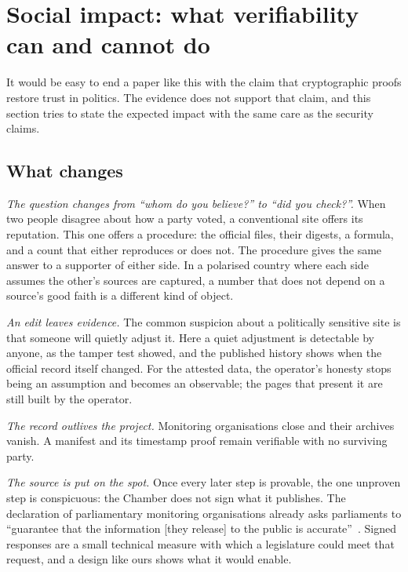 \section{Social impact: what verifiability can and cannot do}
\label{sec:discussion}

It would be easy to end a paper like this with the claim that cryptographic proofs restore trust in politics. The evidence does not support that claim, and this section tries to state the expected impact with the same care as the security claims.

\subsection{What changes}

\emph{The question changes from ``whom do you believe?'' to ``did you check?''.} When two people disagree about how a party voted, a conventional site offers its reputation. This one offers a procedure: the official files, their digests, a formula, and a count that either reproduces or does not. The procedure gives the same answer to a supporter of either side. In a polarised country where each side assumes the other's sources are captured, a number that does not depend on a source's good faith is a different kind of object.

\emph{An edit leaves evidence.} The common suspicion about a politically sensitive site is that someone will quietly adjust it. Here a quiet adjustment is detectable by anyone, as the tamper test showed, and the published history shows when the official record itself changed. For the attested data, the operator's honesty stops being an assumption and becomes an observable; the pages that present it are still built by the operator.

\emph{The record outlives the project.} Monitoring organisations close and their archives vanish. A manifest and its timestamp proof remain verifiable with no surviving party.

\emph{The source is put on the spot.} Once every later step is provable, the one unproven step is conspicuous: the Chamber does not sign what it publishes. The declaration of parliamentary monitoring organisations already asks parliaments to ``guarantee that the information [they release] to the public is accurate''~\citep{openingparliament2012declaration}. Signed responses are a small technical measure with which a legislature could meet that request, and a design like ours shows what it would enable.

